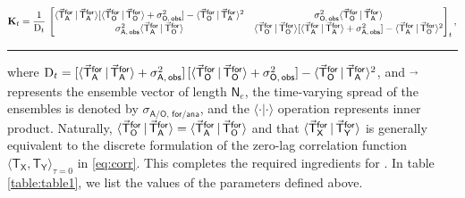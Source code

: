 \documentclass[a4paper,10pt]{article}
\begin{document}
\begin{equation}
\mathbf{K}_t = 
\frac{1}{\mathrm{D}_t}\,\begin{bmatrix}
    \inner{A}{A}[\inner{O}{O} + \sigma^2_{\mathsf{O},\,\mathsf{obs}}] - \inner{O}{A}^2 & \sigma^2_{\mathsf{O},\,\mathsf{obs}}\inner{O}{A} \\
    \sigma^2_{\mathsf{A},\,\mathsf{obs}}\inner{A}{O} & \inner{O}{O}[\inner{A}{A} + \sigma^2_{\mathsf{A},\,\mathsf{obs}}] - \inner{A}{O}^2
\end{bmatrix}_t,
\label{eq:kgain2}
\end{equation}
\begin{multicols}{2}
\noindent\rule{\columnwidth}{0.4pt}\vspace{0.1in}

{\noindent}where $\mathrm{D}_t = [\langle\vec{\mathsf{T}}_\mathsf{A}^\mathsf{for}\,|\,\vec{\mathsf{T}}_\mathsf{A}^\mathsf{for}\rangle + \sigma^2_{\mathsf{A},\,\mathsf{obs}}]\,[\langle\vec{\mathsf{T}}_\mathsf{O}^\mathsf{for}\,|\,\vec{\mathsf{T}}_\mathsf{O}^\mathsf{for}\rangle + \sigma^2_{\mathsf{O},\,\mathsf{obs}}] - \langle\vec{\mathsf{T}}_\mathsf{O}^\mathsf{for}\,|\,\vec{\mathsf{T}}_\mathsf{A}^\mathsf{for}\rangle^2$, and $\vec{\;\;}$ represents the ensemble vector of length $\mathsf{N}_e$, the time-varying spread of the ensembles is denoted by $\sigma_{\mathsf{A/O},\,\mathsf{for/ana}}$, and the $\langle\cdot|\cdot\rangle$ operation represents inner product. Naturally, $\langle\vec{\mathsf{T}}_\mathsf{O}^\mathsf{for}\,|\,\vec{\mathsf{T}}_\mathsf{A}^\mathsf{for}\rangle = \langle\vec{\mathsf{T}}_\mathsf{A}^\mathsf{for}\,|\,\vec{\mathsf{T}}_\mathsf{O}^\mathsf{for}\rangle$ and that $\langle\vec{\mathsf{T}}_\mathsf{X}^\mathsf{for}\,|\,\vec{\mathsf{T}}_\mathsf{Y}^\mathsf{for}\rangle$ is generally equivalent to the discrete formulation of the zero-lag correlation function $\langle\mathsf{T_X,T_Y}\rangle_{\tau = 0}$ in \eqref{eq:corr}. This completes the required ingredients for {\enkf}. In table \ref{table:table1}, we list the values of the parameters defined above. 


\end{multicols}
\end{document}
